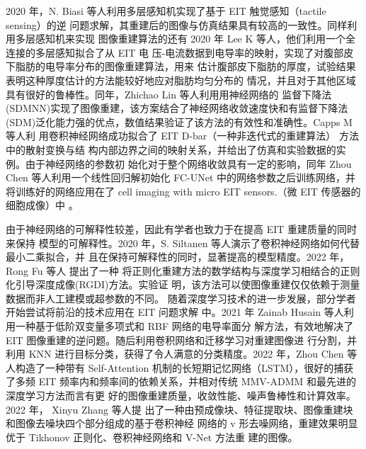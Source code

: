 2020 年，N. Biasi 等人利用多层感知机实现了基于 EIT 触觉感知（tactile sensing）的逆
问题求解，其重建后的图像与仿真结果具有较高的一致性\cite{9278823}。同样利用多层感知机来实现
图像重建算法的还有 2020 年 Lee K 等人，他们利用一个全连接的多层感知拟合了从 EIT 电
压-电流数据到电导率的映射，实现了对腹部皮下脂肪的电导率分布的图像重建算法，用来
估计腹部皮下脂肪的厚度，试验结果表明这种厚度估计的方法能较好地应对脂肪均匀分布的
情况，并且对于其他区域具有很好的鲁棒性\cite{2020Electrical}。同年，Zhichao Lin 等人利用用神经网络的
监督下降法(SDMNN)实现了图像重建，该方案结合了神经网络收敛速度快和有监督下降法
(SDM)泛化能力强的优点，数值结果验证了该方法的有效性和准确性\cite{9060508}。Capps M 等人利
用卷积神经网络成功拟合了 EIT D-bar（一种非迭代式的重建算法） 方法中的散射变换与结
构内部边界之间的映射关系，并给出了仿真和实验数据的实例\cite{9130138}。由于神经网络的参数初
始化对于整个网络收敛具有一定的影响，同年 Zhou Chen 等人利用一个线性回归解初始化
FC-UNet 中的网络参数之后训练网络，并将训练好的网络应用在了 cell imaging with micro
EIT sensors.（微 EIT 传感器的细胞成像）中 \cite{9128764}。

由于神经网络的可解释性较差，因此有学者也致力于在提高 EIT 重建质量的同时来保持
模型的可解释性。2020 年，S. Siltanen 等人演示了卷积神经网络如何代替最小二乘拟合，并
且在保持可解释性的同时，显著提高的模型精度\cite{9231717}。2022 年，Rong Fu 等人 提出了一种
将正则化重建方法的数学结构与深度学习相结合的正则化引导深度成像(RGDI)方法。实验证
明，该方法可以使图像重建仅仅依赖于测量数据而非人工建模或超参数的不同\cite{9739002}。
随着深度学习技术的进一步发展，部分学者开始尝试将前沿的技术应用在 EIT 问题求解
中。2021 年 Zainab Husain 等人利用一种基于低阶双变量多项式和 RBF 网络的电导率面分
解方法，有效地解决了 EIT 图像重建的逆问题。随后利用卷积网络和迁移学习对重建图像进
行分割，并利用 KNN 进行目标分类，获得了令人满意的分类精度\cite{9336698}。2022 年，Zhou Chen
等人构造了一种带有 Self-Attention 机制的长短期记忆网络（LSTM），很好的捕获了多频 EIT
频率内和频率间的依赖关系，并相对传统 MMV-ADMM 和最先进的深度学习方法而言有更
好的图像重建质量，收敛性能、噪声鲁棒性和计算效率\cite{9732193}。2022 年， Xinyu Zhang 等人提
出了一种由预成像块、特征提取块、图像重建块和图像去噪块四个部分组成的基于卷积神经
网络的 v 形去噪网络，重建效果明显优于 Tikhonov 正则化、卷积神经网络和 V-Net 方法重
建的图像\cite{9754540}。

